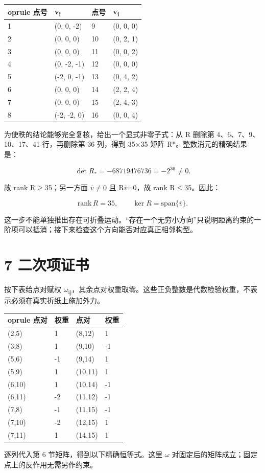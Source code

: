 \documentclass[UTF8,a4paper,11pt]{ctexart}
\begin{document}
\begin{longtable}{llll}	oprule
点号 & v\textsubscript{i} & 点号 & v\textsubscript{i} \\ \midrule
1 & (0, 0, -2) & 9 & (0, 0, 0) \\
2 & (0, 0, 0) & 10 & (0, 2, 1) \\
3 & (0, 0, 0) & 11 & (0, 0, 2) \\
4 & (0, -2, -1) & 12 & (0, 0, 0) \\
5 & (-2, 0, -1) & 13 & (0, 4, 2) \\
6 & (0, 0, 0) & 14 & (2, 2, 4) \\
7 & (0, 0, 0) & 15 & (2, 4, 3) \\
8 & (-2, -2, 0) & 16 & (0, 0, 4) \\
\bottomrule\end{longtable}
为使秩的结论能够完全复核，给出一个显式非零子式：从 R 删除第 4、6、7、9、10、17、41 行，再删除第 36 列，得到 35\(\times\)35 矩阵 R*。整数消元的精确结果是：


\[
\det R_*=-68719476736=-2^{36}\ne0.
\]

故 rank R\(\ge\)35；另一方面 \(\bar v\)\(\ne\)0 且 R\(\bar v\)=0，故 rank R\(\le\)35。因此：


\[
\mathrm{rank}\,R=35,\qquad\ker R=\mathrm{span}\{\bar v\}.
\]

这一步不能单独推出存在可折叠运动。“存在一个无穷小方向”只说明距离约束的一阶项可以抵消；接下来检查这个方向能否对应真正相邻构型。

\newpage
\section*{7  二次项证书}
按下表给点对赋权 \(\omega\)\textsubscript{ij}，其余点对权重取零。这些正负整数是代数检验权重，不表示必须在真实折纸上施加外力。

\begin{longtable}{llll}	oprule
点对 & 权重 & 点对 & 权重 \\ \midrule
(2,5) & 1 & (8,12) & 1 \\
(3,8) & 1 & (9,10) & -1 \\
(5,6) & -1 & (9,14) & 1 \\
(5,9) & 1 & (10,11) & 1 \\
(6,10) & 1 & (10,14) & -1 \\
(6,11) & -2 & (11,12) & -1 \\
(7,8) & -1 & (11,15) & -1 \\
(7,10) & -2 & (12,15) & 1 \\
(7,11) & 1 & (14,15) & 1 \\
\bottomrule\end{longtable}
逐列代入第 6 节矩阵，得到以下精确恒等式。这里 \(\omega\) 对固定后的矩阵成立；固定点上的反作用无需另作约束。
\end{document}
